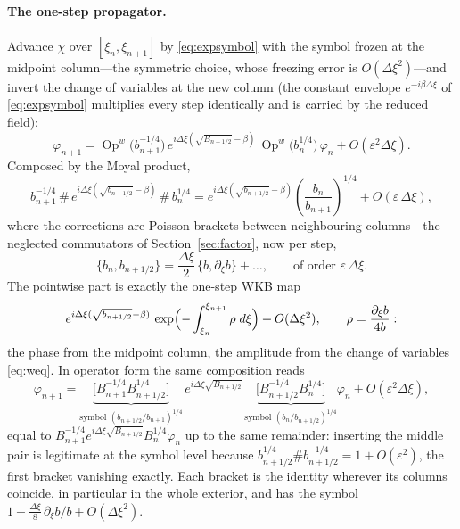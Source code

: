 \documentclass[11pt]{article}
\newcommand{\pd}{\partial}
\newcommand{\Op}{\operatorname{Op}^w}
\begin{document}
\paragraph{The one-step propagator.} Advance $\chi$ over
$[\xi_n,\xi_{n+1}]$ by \eqref{eq:expsymbol} with the symbol frozen at the
midpoint column---the symmetric choice, whose freezing error is
$O(\Delta\xi^2)$---and invert the change of variables at the new column
(the constant envelope $e^{-i\beta\Delta\xi}$ of \eqref{eq:expsymbol}
multiplies every step identically and is carried by the reduced field):
\[
\varphi_{n+1}=\Op\bigl(b_{n+1}^{-1/4}\bigr)\,
e^{i\Delta\xi(\sqrt{B_{n+1/2}}-\beta)}\,
\Op\bigl(b_n^{1/4}\bigr)\,\varphi_n+O(\varepsilon^2\Delta\xi).
\]
Composed by the Moyal product,
\[
b_{n+1}^{-1/4}\,\#\,e^{i\Delta\xi(\sqrt{b_{n+1/2}}-\beta)}\,\#\,b_n^{1/4}
=e^{i\Delta\xi(\sqrt{b_{n+1/2}}-\beta)}
\left(\frac{b_n}{b_{n+1}}\right)^{1/4}+O(\varepsilon\,\Delta\xi),
\]
where the corrections are Poisson brackets between neighbouring
columns---the neglected commutators of Section~\ref{sec:factor}, now per
step,
\[
\{b_n,b_{n+1/2}\}=\frac{\Delta\xi}2\,\{b,\pd_\xi b\}+\dots,\qquad
\text{of order } \varepsilon\,\Delta\xi .
\]
The pointwise part is exactly the one-step WKB map
\[
e^{i\Delta\xi(\sqrt{b_{n+1/2}}-\beta)}
\,\exp\Bigl(-\int_{\xi_n}^{\xi_{n+1}}\rho\;d\xi\Bigr)+O(\Delta\xi^2),
\qquad \rho=\frac{\pd_\xi b}{4b}:
\]
the phase from the midpoint column, the amplitude from the change of
variables \eqref{eq:weq}. In operator form the same composition reads
\begin{equation}\label{eq:step}
\varphi_{n+1}=\underbrace{\bigl[B_{n+1}^{-1/4}B_{n+1/2}^{1/4}\bigr]}_{\text{symbol }(b_{n+1/2}/b_{n+1})^{1/4}}
\,e^{i\Delta\xi\sqrt{B_{n+1/2}}}\,
\underbrace{\bigl[B_{n+1/2}^{-1/4}B_n^{1/4}\bigr]}_{\text{symbol }(b_n/b_{n+1/2})^{1/4}}\varphi_n
+O(\varepsilon^2\Delta\xi),
\end{equation}
equal to $B_{n+1}^{-1/4}e^{i\Delta\xi\sqrt{B_{n+1/2}}}B_n^{1/4}\varphi_n$ up
to the same remainder: inserting the middle pair is legitimate at the symbol
level because $b_{n+1/2}^{1/4}\#b_{n+1/2}^{-1/4}=1+O(\varepsilon^2)$, the
first bracket vanishing exactly. Each bracket is the identity wherever its
columns coincide, in particular in the whole exterior, and has the symbol
$1-\tfrac{\Delta\xi}8\,\pd_\xi b/b+O(\Delta\xi^2)$.
\end{document}
